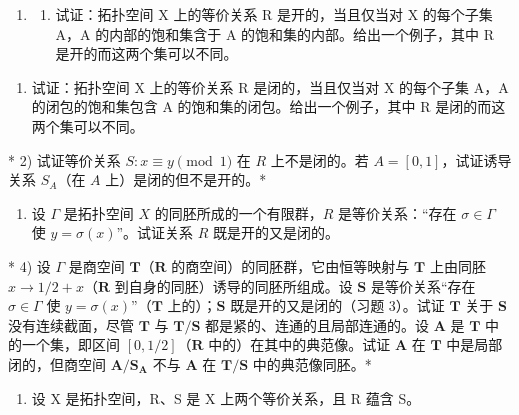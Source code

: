 \BourbakiExerciseGroup

\begin{enumerate}
\def\labelenumi{\arabic{enumi})}
\tightlist
\item
  \begin{enumerate}
  \def\labelenumii{\alph{enumii})}
  \tightlist
  \item
    试证：拓扑空间 X 上的等价关系 R 是开的，当且仅当对 X 的每个子集 A，A 的内部的饱和集含于 A 的饱和集的内部。给出一个例子，其中 R 是开的而这两个集可以不同。
  \end{enumerate}
\end{enumerate}

\begin{enumerate}
\def\labelenumi{\alph{enumi})}
\setcounter{enumi}{1}
\tightlist
\item
  试证：拓扑空间 X 上的等价关系 R 是闭的，当且仅当对 X 的每个子集 A，A 的闭包的饱和集包含 A 的饱和集的闭包。给出一个例子，其中 R 是闭的而这两个集可以不同。
\end{enumerate}

* 2) 试证等价关系 \(S: x \equiv y \pmod{1}\) 在 \(R\) 上不是闭的。若 \(A = [0,1]\)，试证诱导关系 \(S_A\)（在 \(A\) 上）是闭的但不是开的。*

\begin{enumerate}
\def\labelenumi{\arabic{enumi})}
\setcounter{enumi}{2}
\tightlist
\item
  设 \(\Gamma\) 是拓扑空间 \(X\) 的同胚所成的一个有限群，\(R\) 是等价关系：“存在 \(\sigma \in \Gamma\) 使 \(y = \sigma(x)\)”。试证关系 \(R\) 既是开的又是闭的。
\end{enumerate}

* 4) 设 \(\Gamma\) 是商空间 \(\mathbf{T}\)（\(\mathbf{R}\) 的商空间）的同胚群，它由恒等映射与 \(\mathbf{T}\) 上由同胚 \(x \to 1/2 + x\)（\(\mathbf{R}\) 到自身的同胚）诱导的同胚所组成。设 \(\mathbf{S}\) 是等价关系“存在 \(\sigma \in \Gamma\) 使 \(y = \sigma(x)\)”（\(\mathbf{T}\) 上的）；\(\mathbf{S}\) 既是开的又是闭的（习题 3）。试证 \(\mathbf{T}\) 关于 \(\mathbf{S}\) 没有连续截面，尽管 \(\mathbf{T}\) 与 \(\mathbf{T}/\mathbf{S}\) 都是紧的、连通的且局部连通的。设 \(\mathbf{A}\) 是 \(\mathbf{T}\) 中的一个集，即区间 \([0,1/2]\)（\(\mathbf{R}\) 中的）在其中的典范像。试证 \(\mathbf{A}\) 在 \(\mathbf{T}\) 中是局部闭的，但商空间 \(\mathbf{A}/\mathbf{S}_{\mathbf{A}}\) 不与 \(\mathbf{A}\) 在 \(\mathbf{T}/\mathbf{S}\) 中的典范像同胚。*

\begin{enumerate}
\def\labelenumi{\arabic{enumi})}
\setcounter{enumi}{4}
\tightlist
\item
  设 X 是拓扑空间，R、S 是 X 上两个等价关系，且 R 蕴含 S。
\end{enumerate}

